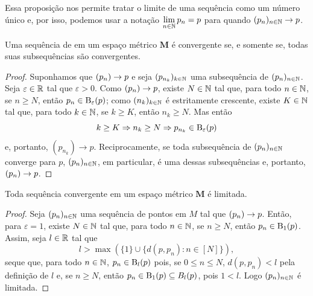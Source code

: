Essa proposição nos permite tratar o limite de uma sequência como um número único e, por isso, podemos usar a notação $\displaystyle\lim_{n \in \mathbb{N}} p_n = p$ para quando $(p_n)_{n \in \mathbb{N}} \rightarrow p$.

\begin{prop}
Uma sequência de em um espaço métrico $\bm M$ é convergente se, e somente se, todas suas subsequências são convergentes.
\end{prop}
\begin{proof}
	Suponhamos que $(p_n) \rightarrow p$ e seja $(p_{n_k})_{k \in \mathbb{N}}$ uma subsequência de $(p_n)_{n \in \mathbb{N}}$. Seja $\varepsilon \in \mathbb{R}$ tal que $\varepsilon > 0$. Como $(p_n) \rightarrow p$, existe $N \in \mathbb{N}$ tal que, para todo $n \in \mathbb{N}$, se $n \geq N$, então $p_n \in \mathrm{B}_\varepsilon(p)$; como $(n_k)_{k \in \mathbb{N}}$ é estritamente crescente, existe $K \in \mathbb{N}$ tal que, para todo $k \in \mathbb{N}$, se $k \geq K$, então $n_k \geq N$. Mas então
	\begin{equation*}
	k \geq K \Rightarrow n_k \geq N \Rightarrow p_{n_k} \in \mathrm{B}_\varepsilon(p)
	\end{equation*}
e, portanto, $(p_{n_k}) \to p$.	Reciprocamente, se toda subsequência de $(p_n)_{n \in \mathbb{N}}$ converge para $p$, $(p_n)_{n \in \mathbb{N}}$, em particular, é uma dessas subsequências e, portanto, $(p_n) \rightarrow p$.
\end{proof}

\begin{prop}
Toda sequência convergente em um espaço métrico $\bm M$ é limitada.
\end{prop}
\begin{proof}
	Seja $(p_n)_{n \in \mathbb{N}}$ uma sequência de pontos em $M$ tal que $(p_n) \rightarrow p$. Então, para $\varepsilon = 1$, existe $N \in \mathbb{N}$ tal que, para todo $n \in \mathbb{N}$, se $n \geq N$, então $p_n \in \mathrm{B}_1(p)$. Assim, seja $l \in \mathbb{R}$ tal que
	\begin{equation*}
	l > \max(\{1\} \cup \{d(p,p_n) : n \in [N]\}),
	\end{equation*}
seque que, para todo $n \in \mathbb{N}$, $p_n \in \mathrm{B}_l(p)$ pois, se $0 \leq n \leq N$, $d(p,p_n) < l$ pela definição de $l$ e, se $n \geq N$, então $p_n \in \mathrm{B}_1(p) \subseteq B_l(p)$, pois $1 < l$. Logo $(p_n)_{n \in \mathbb{N}}$ é limitada.
\end{proof}

